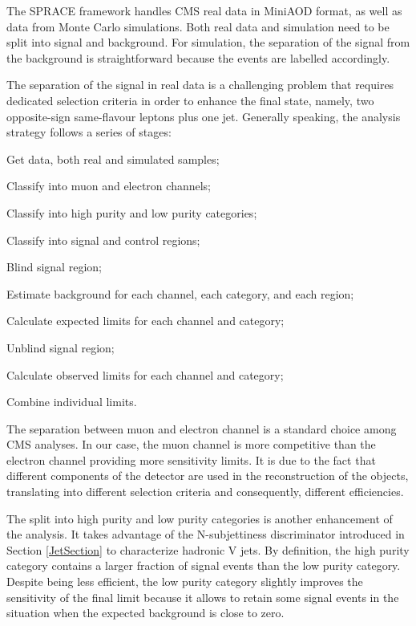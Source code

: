 The SPRACE framework handles CMS real data in MiniAOD format, as well as data from Monte Carlo simulations. Both real data and simulation need to be split into signal and background. For simulation, the separation of the signal from the background is straightforward because the events are labelled accordingly.

The separation of the signal in real data is a challenging problem that requires dedicated selection criteria in order to enhance the final state, namely, two opposite-sign same-flavour leptons plus one jet. Generally speaking, the analysis strategy follows a series of stages:

\begin{compact_enumerate}
	\item Get data, both real and simulated samples;
	\item Classify into muon and electron channels;
	\item Classify into high purity and low purity categories;
	\item Classify into signal and control regions;
	\item Blind signal region;
	\item Estimate background for each channel, each category, and each region;
	\item Calculate expected limits for each channel and category;
	\item Unblind signal region;
	\item Calculate observed limits for each channel and category;
	\item Combine individual limits. 
\end{compact_enumerate}

The separation between muon and electron channel is a standard choice among CMS analyses. In our case, the muon channel is more competitive than the electron channel providing more sensitivity limits. It is due to the fact that different components of the detector are used in the reconstruction of the objects, translating into different selection criteria and consequently, different efficiencies. 

The split into high purity and low purity categories is another enhancement of the analysis. It takes advantage of the N-subjettiness discriminator introduced in Section \ref{JetSection} to characterize hadronic V jets. By definition, the high purity category contains a larger fraction of signal events than the low purity category. Despite being less efficient, the low purity category slightly improves the sensitivity of the final limit because it allows to retain some signal events in the situation when the expected background is close to zero. %


